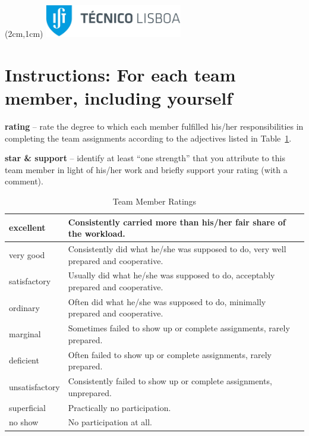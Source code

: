 \documentclass[12pt,a4paper]{article}
\begin{document}
\textblockorigin{-18pt}{-2pt}
\begin{textblock*}{10cm}(2cm,1cm)
\includegraphics[width=6cm]{IST_C_RGB_POS-01-CROP.jpg}
\end{textblock*}


\section*{Instructions: For each team member, including yourself}

\begin{description}
\footnotesize
\item{\textbf{rating}} -- rate the degree to which each member fulfilled his/her responsibilities in completing the team assignments according to the adjectives listed in Table~\ref{tab:ratings}.
\item{\textbf{star \& support}} -- identify at least ``one strength'' that you attribute to this team member in light of his/her work and briefly support your rating (with a comment).
\end{description}

\begin{table}[htdp]
\caption{Team Member Ratings}
\footnotesize
\centering
\begin{tabular}{|l|l|}
\hline
excellent & Consistently carried more than his/her fair share of the workload. \\
\hline
very good & Consistently did what he/she was supposed to do, very well prepared and cooperative. \\
\hline
satisfactory & Usually did what he/she was supposed to do, acceptably prepared and cooperative. \\
\hline
ordinary & Often did what he/she was supposed to do, minimally prepared and cooperative. \\
\hline
marginal & Sometimes failed to show up or complete assignments, rarely prepared. \\
\hline
deficient & Often failed to show up or complete assignments, rarely prepared. \\
\hline
unsatisfactory & Consistently failed to show up or complete assignments, unprepared. \\
\hline
superficial & Practically no participation. \\
\hline
no show & No participation at all.\\
\hline
\end{tabular}
\label{tab:ratings}
\end{table}%
\end{document}
